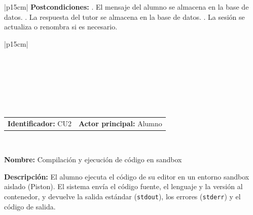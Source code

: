 \begin{longtable}{|p{15cm}|}
  \textbf{Postcondiciones:} . El mensaje del alumno se almacena en la base de datos. . La respuesta del tutor se almacena en la base de datos. . La sesión se actualiza o renombra si es necesario. \\ \hline

\end{longtable}
\endgroup

\begingroup
{} %
\setlength{\arrayrulewidth}{1pt}
\begin{longtable}{|p{15cm}|}

  \hline
   \\
  \hline
  \endfirsthead

   \\
  \hline
   \\
  \hline
  \endhead

  \hline {} \\ \hline
  \endfoot

  \hline
  \caption{Caso de uso 2 — Compilación y ejecución de código en Piston.}
  \label{TB:CU2_PISTON}
  \endlastfoot

  \begin{tabularx}{\linewidth}{@{}X X@{}}
    \textbf{Identificador:} CU2 & \textbf{Actor principal:} Alumno 
  \end{tabularx} \\ \hline

  \textbf{Nombre:} Compilación y ejecución de código en sandbox \\ \hline

  \textbf{Descripción:} \newline 
  El alumno ejecuta el código de su editor en un entorno sandbox aislado (Piston). El sistema envía el código fuente, el lenguaje y la versión al contenedor, y devuelve la salida estándar (\texttt{stdout}), los errores (\texttt{stderr}) y el código de salida. \\ \hline


\end{longtable}
